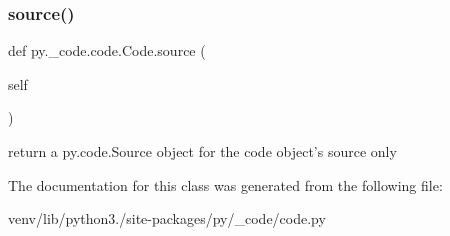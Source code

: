 \subsubsection{\texorpdfstring{source()}{source()}}
{\footnotesize\ttfamily def py.\+\_\+code.\+code.\+Code.\+source (\begin{DoxyParamCaption}\item[{}]{self }\end{DoxyParamCaption})}

\begin{DoxyVerb}return a py.code.Source object for the code object's source only
\end{DoxyVerb}
 

The documentation for this class was generated from the following file\+:\begin{DoxyCompactItemize}
\item 
venv/lib/python3./site-\/packages/py/\+\_\+code/code.\+py\end{DoxyCompactItemize}
